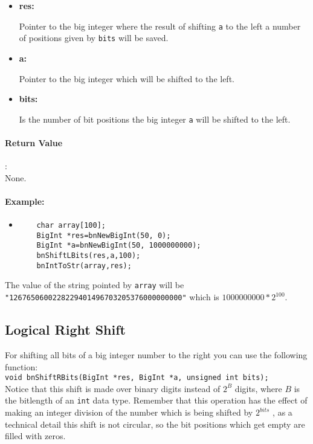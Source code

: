\documentclass{book}
\begin{document}
\begin{itemize}
\item{\bf res:}

Pointer to the big integer where the result of shifting \verb+a+ to the left a number of positions given by \verb+bits+ will be saved.

\item {\bf a:}

Pointer to the big integer which will be shifted to the left. 

\item {\bf bits:}

Is the number of bit positions the big integer \verb+a+ will be shifted to the left.

\end{itemize}

\paragraph{Return Value}:\\

None.

\paragraph{Example:}

\begin{itemize}
\item
\begin{verbatim}
    char array[100];
    BigInt *res=bnNewBigInt(50, 0);
    BigInt *a=bnNewBigInt(50, 1000000000);
    bnShiftLBits(res,a,100);
    bnIntToStr(array,res);
\end{verbatim}
\end{itemize}

The value of the string pointed by \verb+array+ will be \verb+"1267650600228229401496703205376000000000"+  which is $1000000000 * 2^{100}$.

\subsection{Logical Right Shift}

For shifting all bits of a big integer number to the right you can use the following function:\\

\verb+void bnShiftRBits(BigInt *res, BigInt *a, unsigned int bits);+\\

Notice that this shift is made over binary digits instead of $2^B$ digits, where $B$ is the bitlength of an \verb+int+ data type. Remember that this operation has the effect of making an integer division of the number which is being shifted by $2^{bits}$ , as a technical detail this shift is not circular, so the bit positions which get empty are filled with zeros.
\end{document}
